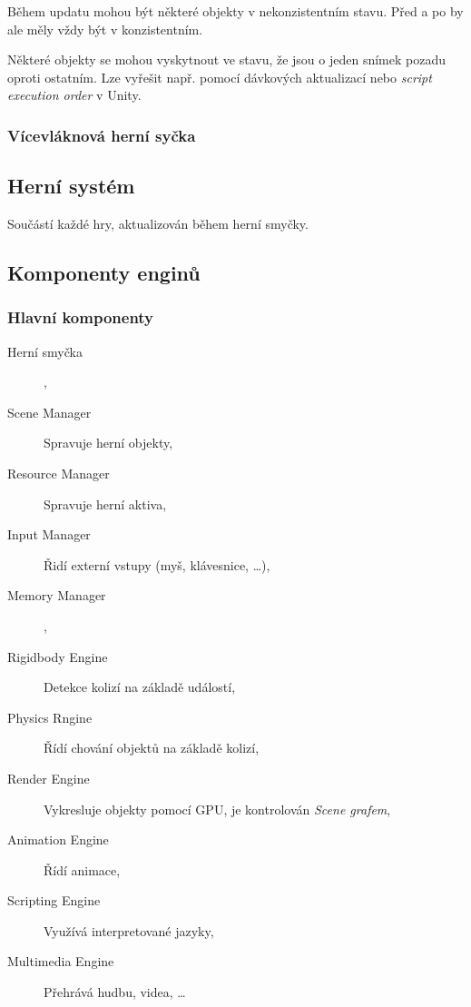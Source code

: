 Během updatu mohou být některé objekty v nekonzistentním stavu.
Před a po by ale měly vždy být v konzistentním.

Některé objekty se mohou vyskytnout ve stavu, že jsou o jeden snímek pozadu oproti ostatním.
Lze vyřešit např. pomocí dávkových aktualizací nebo \textit{script execution order} v Unity.

\subsubsection*{Vícevláknová herní syčka}


\subsection*{Herní systém}

Součástí každé hry, aktualizován během herní smyčky.

\subsection*{Komponenty enginů}

\medskip

\subsubsection*{Hlavní komponenty}

\medskip

\begin{description}
    \item[Herní smyčka],
    \item[Scene Manager] Spravuje herní objekty,
    \item[Resource Manager] Spravuje herní aktiva,
    \item[Input Manager] Řidí externí vstupy (myš, klávesnice, \dots),
    \item[Memory Manager],
    \item[Rigidbody Engine] Detekce kolizí na základě událostí,
    \item[Physics Rngine] Řídí chování objektů na základě kolizí,
    \item[Render Engine] Vykresluje objekty pomocí GPU, je kontrolován \textit{Scene grafem},
    \item[Animation Engine] Řídí animace,
    \item[Scripting Engine] Využívá interpretované jazyky,
    \item[Multimedia Engine] Přehrává hudbu, videa, \dots  
\end{description}

